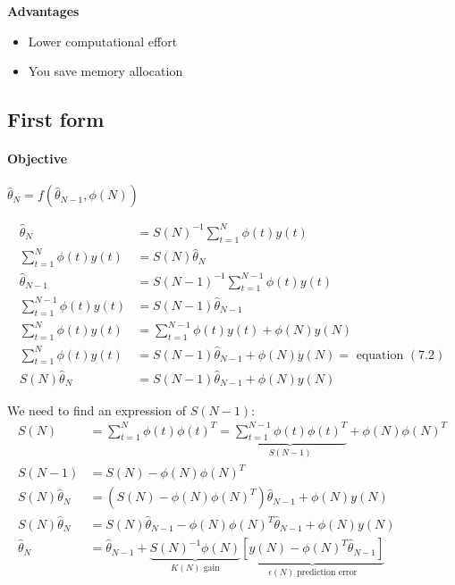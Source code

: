 \textbf{Advantages}
\begin{itemize}
    \item Lower computational effort
    \item You save memory allocation
\end{itemize}

\subsection{First form}

\paragraph{Objective} $\hat{\theta}_N = f(\hat{\theta}_{N-1}, \phi(N))$

\begin{align}
    \hat{\theta}_N &= S(N)^{-1} \sum_{t=1}^N \phi(t)y(t) \\
    \sum_{t=1}^N \phi(t)y(t) &= S(N)\hat{\theta}_N \\
    \hat{\theta}_{N-1} &= S(N-1)^{-1} \sum_{t=1}^{N-1} \phi(t)y(t) \\
    \sum_{t=1}^{N-1} \phi(t)y(t) &= S(N-1)\hat{\theta}_{N-1} \\
    \sum_{t=1}^{N} \phi(t)y(t) &= \sum_{t=1}^{N-1} \phi(t)y(t) + \phi(N)y(N) \\
    \sum_{t=1}^{N} \phi(t)y(t) &= S(N-1)\hat{\theta}_{N-1} + \phi(N)y(N) = \text{ equation } (7.2) \\
    S(N) \hat{\theta}_N &= S(N-1) \hat{\theta}_{N-1} + \phi(N)y(N)
\end{align}

We need to find an expression of $S(N-1)$:
\begin{align*}
    S(N) &= \sum_{t=1}^N \phi(t)\phi(t)^T = \underbrace{\sum_{t=1}^{N-1} \phi(t)\phi(t)^T}_{S(N-1)} + \phi(N)\phi(N)^T \\
    S(N-1) &= S(N) - \phi(N)\phi(N)^T \\
    S(N)\hat{\theta}_N &= \left( S(N) - \phi(N)\phi(N)^T \right)\hat{\theta}_{N-1} + \phi(N)y(N) \\
    S(N)\hat{\theta}_N &= S(N)\hat{\theta}_{N-1} - \phi(N)\phi(N)^T\hat{\theta}_{N-1} + \phi(N)y(N) \\
    \hat{\theta}_N &= \hat{\theta}_{N-1} + \underbrace{S(N)^{-1}\phi(N)}_{K(N)\text{ gain}}\underbrace{\left[ y(N) - \phi(N)^T\hat{\theta}_{N-1} \right]}_{\epsilon(N) \text{ prediction error}}
\end{align*}

